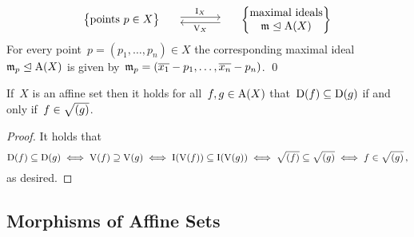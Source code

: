 \begin{theorem}
\[\begin{matrix}
      \\
        {}
      & {}
      & {}
      \\
        \left\{
          \begin{tabular}{@{}c@{}}
            points~$p \in X$
          \end{tabular}
        \right\}
      & \begin{tikzcd}[column sep = large]
            {}
            \arrow[shift left]{r}{\videal_X}
          & {}
            \arrow[shift left]{l}{\vset_X}
        \end{tikzcd}
      & \left\{
          \begin{tabular}{@{}c@{}}
            maximal ideals \\
            $\mf{m} \idealleq \coord(X)$
          \end{tabular}
        \right\}
    \end{matrix}
  \]
  For every point~$p = (p_1, \dotsc, p_n) \in X$ the corresponding maximal ideal~$\mathfrak{m}_p \trianglelefteq \operatorname{A}(X)$ is given by~$\mathfrak{m}_p = (\overline{x_1} - p_1, \dotsc, \overline{x_n} - p_n)$.
  \qed
\end{theorem}


\begin{corollary}
  \label{containment of D}
  If~$X$ is an affine set then it holds for all~$f, g \in \operatorname{A}(X)$ that~$\operatorname{D}(f) \subseteq \operatorname{D}(g)$ if and only if~$f \in \sqrt{(g)}$.
\end{corollary}


\begin{proof}
  It holds that
  \[
          \operatorname{D}(f) \subseteq \operatorname{D}(g)
    \iff  \operatorname{V}(f) \supseteq \operatorname{V}(g)
    \iff  \operatorname{I}(\operatorname{V}(f)) \subseteq \operatorname{I}(\operatorname{V}(g))
    \iff  \sqrt{(f)} \subseteq \sqrt{(g)}
    \iff  f \in \sqrt{(g)} \,,
  \]
  as desired.
\end{proof}





\subsection{Morphisms of Affine Sets}


